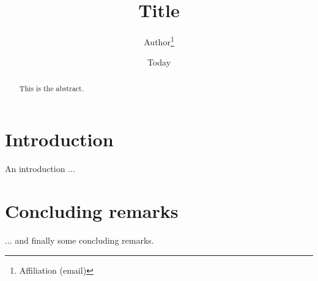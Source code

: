 \documentclass[a4paper,leqno]{article}
\title{Title}
\author{Author\footnote{Affiliation (email)}}
\date{Today} %
\begin{document}
\maketitle

\begin{abstract}
This is the abstract.
\end{abstract}

\section{Introduction}
\label{sec:Introduction}

An introduction ...

\section{Concluding remarks}
\label{sec:Conclusion}

... and finally some concluding remarks.


%
\end{document}
